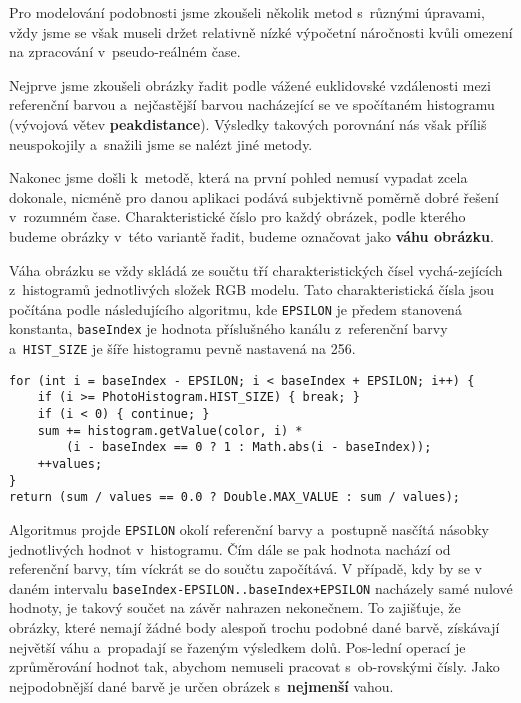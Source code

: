 \documentclass[12pt,oneside,a4paper]{article}
\newenvironment{listing}
{\begin{list}{}{\setlength{\leftmargin}{1em}}\item\scriptsize\bfseries}
{\end{list}}
\begin{document}
Pro modelování podobnosti jsme zkoušeli několik metod s~různými úpravami, vždy jsme se však museli držet relativně nízké výpočetní náročnosti kvůli omezení na zpracování v~pseudo-reálném čase.

Nejprve jsme zkoušeli obrázky řadit podle vážené euklidovské vzdálenosti mezi referenční barvou a~nejčastější barvou nacházející se ve spočítaném histogramu (vývojová větev \textbf{peakdistance}). Výsledky takových porovnání nás však příliš neuspokojily a~snažili jsme se nalézt jiné metody.

Nakonec jsme došli k~metodě, která na první pohled nemusí vypadat zcela dokonale, nicméně pro danou aplikaci podává subjektivně poměrně dobré řešení v~rozumném čase. Charakteristické číslo pro každý obrázek, podle kterého budeme obrázky v~této variantě řadit, budeme označovat jako \textbf{váhu obrázku}.

Váha obrázku se vždy skládá ze součtu tří charakteristických čísel vychá-zejících z~histogramů jednotlivých složek RGB modelu. Tato charakteristická čísla jsou počítána podle následujícího algoritmu, kde \texttt{EPSILON} je předem stanovená konstanta, \texttt{baseIndex} je hodnota příslušného kanálu z~referenční barvy a~\texttt{HIST\_SIZE} je šíře histogramu pevně nastavená na 256.

\begin{listing}
\begin{verbatim}
for (int i = baseIndex - EPSILON; i < baseIndex + EPSILON; i++) {
    if (i >= PhotoHistogram.HIST_SIZE) { break; }
    if (i < 0) { continue; }
    sum += histogram.getValue(color, i) *
        (i - baseIndex == 0 ? 1 : Math.abs(i - baseIndex));
    ++values;
}
return (sum / values == 0.0 ? Double.MAX_VALUE : sum / values);
\end{verbatim}
\end{listing}

Algoritmus projde \texttt{EPSILON} okolí referenční barvy a~postupně nasčítá násobky jednotlivých hodnot v~histogramu. Čím dále se pak hodnota nachází od referenční barvy, tím víckrát se do součtu započítává. V případě, kdy by se v daném intervalu \texttt{baseIndex-EPSILON..baseIndex+EPSILON} nacházely samé nulové hodnoty, je takový součet na závěr nahrazen nekonečnem. To zajišťuje, že obrázky, které nemají žádné body alespoň trochu podobné dané barvě, získávají největší váhu a~propadají se řazeným výsledkem dolů. Pos-lední operací je zprůměrování hodnot tak, abychom nemuseli pracovat s~ob-rovskými čísly. Jako nejpodobnější dané barvě je určen obrázek s~\textbf{nejmenší} vahou.
\end{document}
